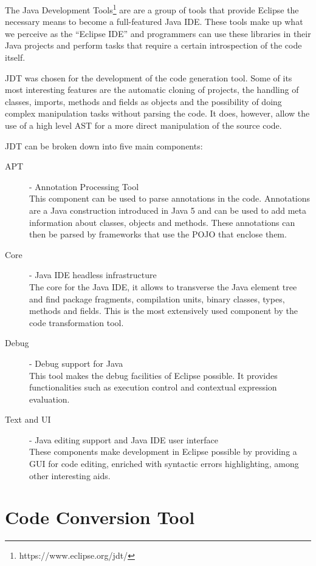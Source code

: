 	The Java Development Tools\footnote{https://www.eclipse.org/jdt/} are are a group of tools that provide Eclipse the necessary means to become a full-featured Java IDE.
	These tools make up what we perceive as the ``Eclipse IDE'' and programmers can use these libraries in their Java projects and perform tasks that require a certain introspection of the code itself. 

	JDT was chosen for the development of the code generation tool. Some of its most interesting features are the automatic cloning of projects, the handling of classes, imports, methods and fields as objects and the possibility of doing complex manipulation tasks without parsing the code. It does, however, allow the use of a high level AST for a more direct manipulation of the source code.

	JDT can be broken down into five main components: 

	\begin{description}
		\item[APT] - Annotation Processing Tool\hfill \\
  			This component can be used to parse annotations in the code. Annotations are a Java construction introduced in Java 5 and can be used to add meta information about classes, objects and methods. These annotations can then be parsed by frameworks that use the POJO that enclose them.
		\item[Core] - Java IDE headless infrastructure \hfill \\
  			The core for the Java IDE, it allows to transverse the Java element tree and find package fragments, compilation units, binary classes, types, methods and fields. This is the most extensively used component by the code transformation tool.
		\item[Debug] - Debug support for Java\hfill \\
  			This tool makes the debug facilities of Eclipse possible. It provides functionalities such as execution control and contextual expression evaluation.
		\item[Text and UI] - Java editing support and Java IDE user interface \hfill \\
  			These components make development in Eclipse possible by providing a GUI for code editing, enriched with syntactic errors highlighting, among other interesting aids.
	\end{description}

\section{Code Conversion Tool}
\label{sec:codeConvertionTool}

